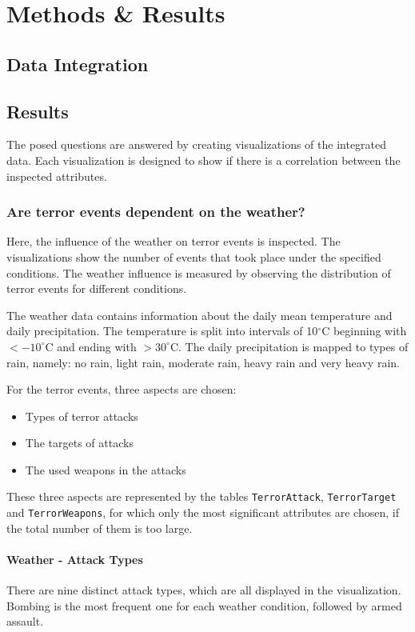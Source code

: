 \section{Methods \& Results}

\subsection{Data Integration}


\subsection{Results}
The posed questions are answered by creating visualizations of the integrated data. Each visualization is designed to show if there is a correlation between the inspected attributes.

\subsubsection{Are terror events dependent on the weather?}
Here, the influence of the weather on terror events is inspected. The visualizations show the number of events that took place under the specified conditions. The weather influence is measured by observing the distribution of terror events for different conditions.

The weather data contains information about the daily mean temperature and daily precipitation. The temperature is split into intervals of 10$^\circ$C beginning with $< -10^\circ$C and ending with $> 30^\circ$C. The daily precipitation is mapped to types of rain, namely: no rain, light rain, moderate rain, heavy rain and very heavy rain.

For the terror events, three aspects are chosen:
\begin{itemize}
	\item Types of terror attacks
	\item The targets of attacks
	\item The used weapons in the attacks
\end{itemize}

These three aspects are represented by the tables \texttt{TerrorAttack}, \texttt{TerrorTarget} and \texttt{TerrorWeapons}, for which only the most significant attributes are chosen, if the total number of them is too large.

\paragraph{Weather - Attack Types}
There are nine distinct attack types, which are all displayed in the visualization. Bombing is the most frequent one for each weather condition, followed by armed assault.

